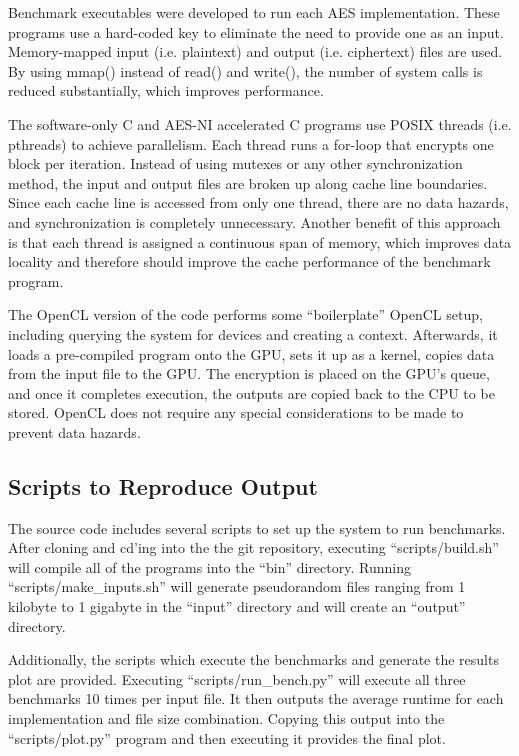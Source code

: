 \documentclass[a4paper,10pt,conference]{IEEEtran}
\begin{document}
Benchmark executables were developed to run each AES implementation.  These programs use a hard-coded key to eliminate the need to provide one as an input.  Memory-mapped input (i.e. plaintext) and output (i.e. ciphertext) files are used.  By using mmap() instead of read() and write(), the number of system calls is reduced substantially, which improves performance.

The software-only C and AES-NI accelerated C programs use POSIX threads (i.e. pthreads) to achieve parallelism.  Each thread runs a for-loop that encrypts one block per iteration.  Instead of using mutexes or any other synchronization method, the input and output files are broken up along cache line boundaries.  Since each cache line is accessed from only one thread, there are no data hazards, and synchronization is completely unnecessary.  Another benefit of this approach is that each thread is assigned a continuous span of memory, which improves data locality and therefore should improve the cache performance of the benchmark program.

The OpenCL version of the code performs some ``boilerplate'' OpenCL setup, including querying the system for devices and creating a context.  Afterwards, it loads a pre-compiled program onto the GPU, sets it up as a kernel, copies data from the input file to the GPU.  The encryption is placed on the GPU's queue, and once it completes execution, the outputs are copied back to the CPU to be stored.  OpenCL does not require any special considerations to be made to prevent data hazards.

\subsection{Scripts to Reproduce Output}

The source code includes several scripts to set up the system to run benchmarks.  After cloning and cd'ing into the the git repository, executing ``scripts/build.sh'' will compile all of the programs into the ``bin'' directory. Running ``scripts/make\_inputs.sh'' will generate pseudorandom files ranging from 1 kilobyte to 1 gigabyte in the ``input'' directory and will create an ``output'' directory.

Additionally, the scripts which execute the benchmarks and generate the results plot are provided.  Executing ``scripts/run\_bench.py'' will execute all three benchmarks 10 times per input file.  It then outputs the average runtime for each implementation and file size combination.  Copying this output into the ``scripts/plot.py'' program and then executing it provides the final plot.
\end{document}
